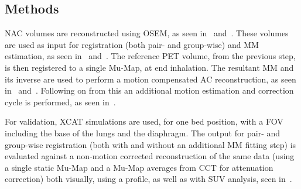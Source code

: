         \subsection{Methods} \label{sec:comparison_of_motion_correction_methods_incorporating_motion_modelling_for_pet_ct_using_a_single_breath_hold_attenuation_map_methods}
            \gls{NAC} volumes are reconstructed using \gls{OSEM}, as seen in~ and~. These volumes are used as input for registration (both pair- and group-wise) and \gls{MM} estimation, as seen in~ and~. The reference \gls{PET} volume, from the previous step, is then registered to a single \gls{Mu-Map}, at end inhalation. The resultant \gls{MM} and its inverse are used to perform a motion compensated \gls{AC} reconstruction, as seen in~ and~. Following on from this an additional motion estimation and correction cycle is performed, as seen in~.
            
            For validation, \gls{XCAT} simulations are used, for one bed position, with a \gls{FOV} including the base of the lungs and the diaphragm. The output for pair- and group-wise registration (both with and without an additional \gls{MM} fitting step) is evaluated against a non-motion corrected reconstruction of the same data (using a single static \gls{Mu-Map} and a \gls{Mu-Map} averages from \gls{CCT} for attenuation correction) both visually, using a profile, as well as with \gls{SUV} analysis, seen in~.
            
